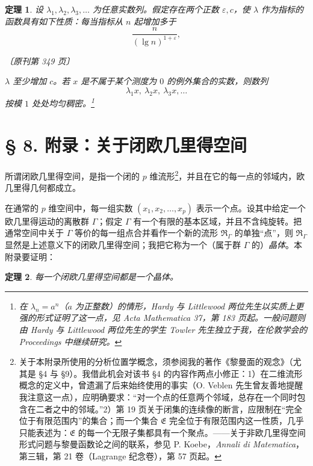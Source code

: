 \documentclass[UTF8,11pt,a4paper,fontset=none]{ctexart}
\theoremstyle{weylthm}
\newtheorem{theorem}{定理}
\newcommand{\origpage}[1]{%
  \par\vspace{0.7em}\noindent\hfill{\small\itshape〔原刊第 #1 页〕}\par\vspace{0.25em}}
\begin{document}
\begin{theorem}
设 \(\lambda_1,\lambda_2,\lambda_3,\ldots\) 为任意实数列。假定存在两个正数
\(\varepsilon,c\)，使 \(\lambda\) 作为指标的函数具有如下性质：每当指标从
\(n\) 起增加多于
\[
  \frac{n}{(\lg n)^{1+\varepsilon}},
\]

\origpage{349}

\(\lambda\) 至少增加 \(c\)。若 \(x\) 是不属于某个测度为 \(0\) 的例外集合的实数，则数列
\[
  \lambda_1x,\ \lambda_2x,\ \lambda_3x,\ldots
\]
按模 \(1\) 处处均匀稠密。\footnote{在 \(\lambda_n=a^n\)（\(a\) 为正整数）的情形，Hardy 与 Littlewood 两位先生以实质上更强的形式证明了这一点，见 \emph{Acta Mathematica} 37，第 183 页起。一般问题则由 Hardy 与 Littlewood 两位先生的学生 Towler 先生独立于我，在伦敦学会的 \emph{Proceedings} 中继续研究。}
\end{theorem}

\section*{§ 8. 附录：关于闭欧几里得空间}

所谓闭欧几里得空间，是指一个闭的 \(p\) 维流形\footnote{关于本附录所使用的分析位置学概念，须参阅我的著作《黎曼面的观念》（尤其是 §4 与 §9）。我借此机会对该书 §4 的内容作两点小修正：1）在二维流形概念的定义中，曾遗漏了后来始终使用的事实（O. Veblen 先生曾友善地提醒我注意这一点），应明确要求：“对一个点的任意两个邻域，总存在一个同时包含在二者之中的邻域。”2）第 19 页关于闭集的连续像的断言，应限制在“完全位于有限范围内”的集合；而一个集合 \(\mathfrak E\) 完全位于有限范围内这一性质，几乎只能表述为：\(\mathfrak E\) 的每一个无限子集都具有一个聚点。——关于非欧几里得空间形式问题与黎曼函数论之间的联系，参见 P. Koebe，\emph{Annali di Matematica}，第三辑，第 21 卷（Lagrange 纪念卷），第 57 页起。}，并且在它的每一点的邻域内，欧几里得几何都成立。

在通常的 \(p\) 维空间中，每一组实数 \((x_1,x_2,\ldots,x_p)\) 表示一个点。设其中给定一个欧几里得运动的离散群 \(\Gamma\)；假定 \(\Gamma\) 有一个有限的基本区域，并且不含纯旋转。把通常空间中关于 \(\Gamma\) 等价的每一组点合并看作一个新的流形
\(\mathfrak R_\Gamma\) 的单独“点”，则 \(\mathfrak R_\Gamma\) 显然是上述意义下的闭欧几里得空间；我把它称为一个（属于群 \(\Gamma\) 的）\emph{晶体}。本附录要证明：

\begin{theorem}
每一个闭欧几里得空间都是一个晶体。
\end{theorem}
\end{document}
